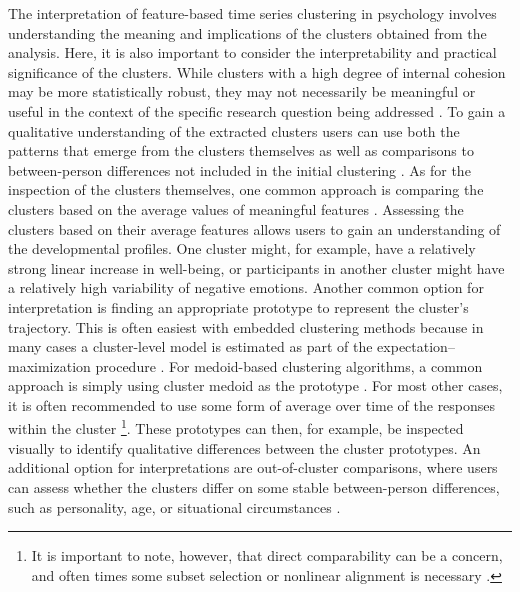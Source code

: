 \documentclass[man, 12pt, a4paper, mask, floatsintext]{apa7}
\theoremstyle{break}
\theoremstyle{plain}
\begin{document}
The interpretation of feature-based time series clustering in psychology involves understanding the meaning and implications of the clusters obtained from the analysis. Here, it is also important to consider the interpretability and practical significance of the clusters. While clusters with a high degree of internal cohesion may be more statistically robust, they may not necessarily be meaningful or useful in the context of the specific research question being addressed \citep{kaufman1990}. To gain a qualitative understanding of the extracted clusters users can use both the patterns that emerge from the clusters themselves as well as comparisons to between-person differences not included in the initial clustering \citep[e.g.,][]{monden2022}. As for the inspection of the clusters themselves, one common approach is comparing the clusters based on the average values of meaningful features \citep{Kennedy2021}. Assessing the clusters based on their average features allows users to gain an understanding of the developmental profiles. One cluster might, for example, have a relatively strong linear increase in well-being, or participants in another cluster might have a relatively high variability of negative emotions. Another common option for interpretation is finding an appropriate prototype to represent the cluster's trajectory. This is often easiest with embedded clustering methods because in many cases a cluster-level model is estimated as part of the expectation–maximization procedure \citep[e.g.,][]{denteuling2021}. For medoid-based clustering algorithms, a common approach is simply using cluster medoid as the prototype \citep{kaufman1990}. For most other cases, it is often recommended to use some form of average over time of the responses within the cluster \citep{niennattrakul2007}\footnote{It is important to note, however, that direct comparability can be a concern, and often times some subset selection or nonlinear alignment is necessary \citep[e.g.,][]{gupta1996}.}. These prototypes can then, for example, be inspected visually to identify qualitative differences between the cluster prototypes. An additional option for interpretations are out-of-cluster comparisons, where users can assess whether the clusters differ on some stable between-person differences, such as personality, age, or situational circumstances \citep[e.g.,][]{monden2022}.
\end{document}
